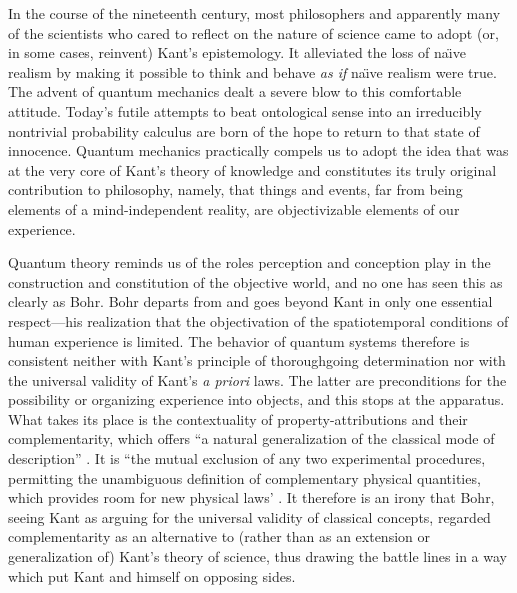 \documentclass[12pt]{article}
\begin{document}
In the course of the nineteenth century, most philosophers and apparently many of the scientists who cared to reflect on the nature of science came to  adopt (or, in some cases, reinvent) Kant's epistemology. It alleviated the loss of na\"\i ve realism by making it possible to think and behave \emph{as if} na\"\i ve realism were true. The advent of quantum mechanics dealt a severe blow to this comfortable attitude. Today's futile attempts to beat ontological sense into an irreducibly nontrivial probability calculus are born of the hope to return to that state of innocence. Quantum mechanics practically compels us to adopt the idea that was at the very core of Kant's theory of knowledge and constitutes its truly original contribution to philosophy, namely, that things and events, far from being elements of a mind-independent reality, are objectivizable elements of our experience.

Quantum theory reminds us of the roles perception and conception play in the construction and constitution of the objective world, and no one has seen this as clearly as Bohr. Bohr departs from and goes beyond Kant in only one essential respect---his realization that the {objectivation} of the spatiotemporal conditions of human experience is limited. The behavior of quantum systems therefore is consistent neither with Kant's principle of thoroughgoing determination nor with the universal validity of Kant's \emph{a priori} laws. The latter are preconditions for the possibility or organizing experience into objects, and this stops at the apparatus. What takes its place is the contextuality of property-attributions and their complementarity, which offers ``a natural generalization of the classical mode of description'' \cite{BohrQPRDAP}. It is ``the mutual exclusion of any two experimental procedures, permitting the unambiguous definition of complementary physical quantities, which provides room for new physical laws' \cite{Bohr-APHKb}. It therefore is an irony that Bohr, seeing Kant as arguing for the universal validity of {classical concepts}, regarded {complementarity} as an alternative to (rather than as an extension or generalization of) Kant's theory of science, thus drawing the battle lines in a way which put {Kant} and himself on opposing sides.
\end{document}
